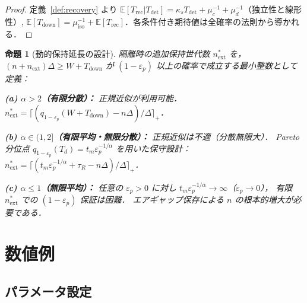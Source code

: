 \documentclass[12pt,a4paper]{article}
\theoremstyle{plain}
\newtheorem{proposition}[theorem]{命題}
\theoremstyle{definition}
\theoremstyle{remark}
\newcommand{\E}{\mathbb{E}}
\newcommand{\Tdet}{T_{\mathrm{det}}}
\newcommand{\Trec}{T_{\mathrm{rec}}}
\newcommand{\Tdown}{T_{\mathrm{down}}}
\begin{document}
\begin{proof}
定義~\ref{def:recovery} より $\E[\Trec|\Tdet]=\kappa_s\Tdet+\mu_c^{-1}+\mu_d^{-1}$（独立性と線形性）,
$\E[\Tdown]=\mu_{\mathrm{iso}}^{-1}+\E[\Trec]$．各条件付き期待値は全確率の法則から導かれる．
\end{proof}

\begin{proposition}[動的保持延長の設計]\label{prop:next}
隔離時の追加保持世代数 $n_{\mathrm{ext}}^*$ を，
$(n+n_{\mathrm{ext}})\Delta\ge W+\Tdown$ が $(1-\varepsilon_p)$ 以上の確率で成立する最小整数として定義：

\noindent\textbf{(a) $\alpha>2$（有限分散）：}
正規近似が利用可能．$n_{\mathrm{ext}}^*=\lceil(q_{1-\varepsilon_p}(W+\Tdown)-n\Delta)/\Delta\rceil_+$．

\noindent\textbf{(b) $\alpha\in(1,2]$（有限平均・無限分散）：}
正規近似は不適（分散無限大）．
Pareto 分位点 $q_{1-\varepsilon_p}(T_d)=t_m\varepsilon_p^{-1/\alpha}$ を用いた保守設計：
$n_{\mathrm{ext}}^*=\lceil(t_m\varepsilon_p^{-1/\alpha}+\tau_R-n\Delta)/\Delta\rceil_+$．

\noindent\textbf{(c) $\alpha\le1$（無限平均）：}
任意の $\varepsilon_p>0$ に対し $t_m\varepsilon_p^{-1/\alpha}\to\infty$（$\varepsilon_p\to0$），
有限 $n_{\mathrm{ext}}^*$ での $(1-\varepsilon_p)$ 保証は困難．
エアギャップ保存による $n$ の根本的増大が必要である．
\end{proposition}

\section{数値例}
\label{sec:numerical}

\subsection{パラメータ設定}
\end{document}
